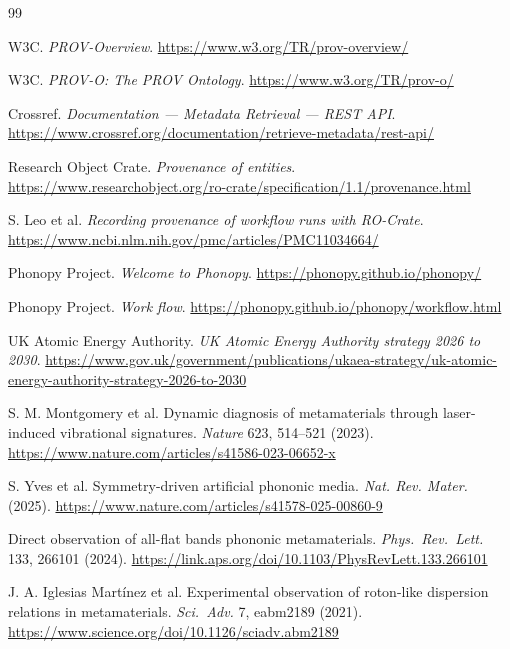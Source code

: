 \documentclass[11pt,a4paper]{article}
\begin{document}
\begin{thebibliography}{99}

W3C.
\newblock \emph{PROV-Overview}.
\newblock \url{https://www.w3.org/TR/prov-overview/}

W3C.
\newblock \emph{PROV-O: The PROV Ontology}.
\newblock \url{https://www.w3.org/TR/prov-o/}

Crossref.
\newblock \emph{Documentation --- Metadata Retrieval --- REST API}.
\newblock \url{https://www.crossref.org/documentation/retrieve-metadata/rest-api/}

Research Object Crate.
\newblock \emph{Provenance of entities}.
\newblock \url{https://www.researchobject.org/ro-crate/specification/1.1/provenance.html}

S. Leo et al.
\newblock \emph{Recording provenance of workflow runs with RO-Crate}.
\newblock \url{https://www.ncbi.nlm.nih.gov/pmc/articles/PMC11034664/}

Phonopy Project.
\newblock \emph{Welcome to Phonopy}.
\newblock \url{https://phonopy.github.io/phonopy/}

Phonopy Project.
\newblock \emph{Work flow}.
\newblock \url{https://phonopy.github.io/phonopy/workflow.html}

UK Atomic Energy Authority.
\newblock \emph{UK Atomic Energy Authority strategy 2026 to 2030}.
\newblock \url{https://www.gov.uk/government/publications/ukaea-strategy/uk-atomic-energy-authority-strategy-2026-to-2030}

S. M. Montgomery et al.
\newblock Dynamic diagnosis of metamaterials through laser-induced vibrational signatures.
\newblock \emph{Nature} 623, 514--521 (2023).
\newblock \url{https://www.nature.com/articles/s41586-023-06652-x}

S. Yves et al.
\newblock Symmetry-driven artificial phononic media.
\newblock \emph{Nat. Rev. Mater.} (2025).
\newblock \url{https://www.nature.com/articles/s41578-025-00860-9}

Direct observation of all-flat bands phononic metamaterials.
\newblock \emph{Phys.\ Rev.\ Lett.} 133, 266101 (2024).
\newblock \url{https://link.aps.org/doi/10.1103/PhysRevLett.133.266101}

J. A. Iglesias Martínez et al.
\newblock Experimental observation of roton-like dispersion relations in metamaterials.
\newblock \emph{Sci.\ Adv.} 7, eabm2189 (2021).
\newblock \url{https://www.science.org/doi/10.1126/sciadv.abm2189}


\end{thebibliography}
\end{document}
